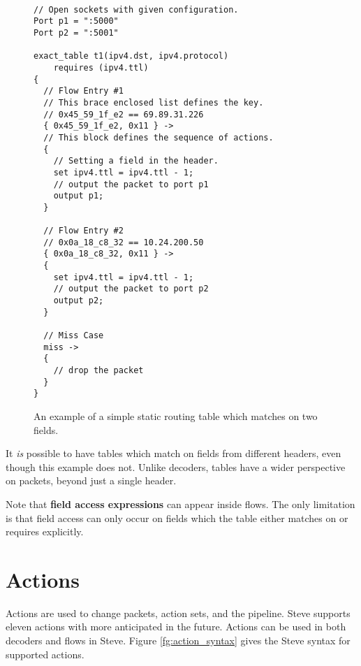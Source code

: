 \begin{figure}
\begin{lstlisting}

// Open sockets with given configuration.
Port p1 = ":5000"
Port p2 = ":5001"

exact_table t1(ipv4.dst, ipv4.protocol)
	requires (ipv4.ttl)
{
  // Flow Entry #1
  // This brace enclosed list defines the key.
  // 0x45_59_1f_e2 == 69.89.31.226
  { 0x45_59_1f_e2, 0x11 } ->
  // This block defines the sequence of actions.
  {
    // Setting a field in the header.
    set ipv4.ttl = ipv4.ttl - 1;
    // output the packet to port p1
    output p1;
  }
  
  // Flow Entry #2
  // 0x0a_18_c8_32 == 10.24.200.50
  {	0x0a_18_c8_32, 0x11 } ->
  {
    set ipv4.ttl = ipv4.ttl - 1;
    // output the packet to port p2
    output p2;
  }
  
  // Miss Case
  miss ->
  {
    // drop the packet
  }
}
\end{lstlisting}
\caption{An example of a simple static routing table which matches on two fields.}
\label{fg:basic_table_ex}
\end{figure}


It \textit{is} possible to have tables which match on fields from different headers, even though this example does not. Unlike decoders, tables have a wider perspective on packets, beyond just a single header.

Note that \textbf{field access expressions} can appear inside flows. The only limitation is that field access can only occur on fields which the table either matches on or requires explicitly.

\section{Actions} \label{action_tut}

Actions are used to change packets, action sets, and the pipeline. Steve supports eleven actions with more anticipated in the future. Actions can be used in both decoders and flows in Steve. Figure \ref{fg:action_syntax} gives the Steve syntax for supported actions.

